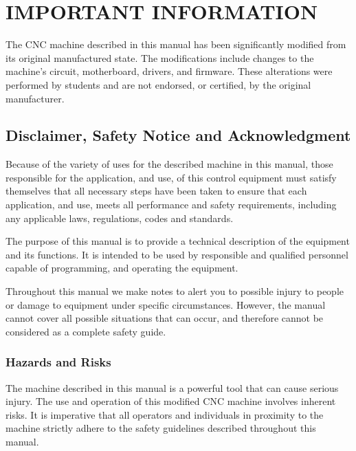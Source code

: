 \documentclass[11pt, openright]{book}
\begin{document}



    
    \newpage

     \section{IMPORTANT INFORMATION}

     The CNC machine described in this manual has been significantly modified from its original manufactured state. The modifications include changes to the machine's circuit, motherboard, drivers, and firmware. These alterations were performed by students and are not endorsed, or certified, by the original manufacturer.

     \subsection{Disclaimer, Safety Notice and Acknowledgment}

     Because of the variety of uses for the described machine in this manual, those responsible for the application, and use, of this control equipment must satisfy themselves that all necessary steps have been taken to ensure that each application, and use, meets all performance and safety requirements, including any applicable laws, regulations, codes and standards.

     The purpose of this manual is to provide a technical description of the equipment and its functions. It is intended to be used by responsible and qualified personnel capable of programming, and operating the equipment.

     Throughout this manual we make notes to alert you to possible injury to people or damage to equipment under specific circumstances. However, the manual cannot cover all possible situations that can occur, and therefore cannot be considered as a complete safety guide.


      \subsubsection{Hazards and Risks}

        The machine described in this manual is a powerful tool that can cause serious injury. The use and operation of this modified CNC machine involves inherent risks. It is imperative that all operators and individuals in proximity to the machine strictly adhere to the safety guidelines described throughout this manual.
\end{document}
